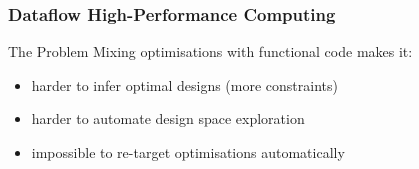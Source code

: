\begin{frame}[fragile]
  \frametitle{Dataflow High-Performance Computing}

  \begin{beamerboxesrounded}{The Problem}
    Mixing optimisations with functional code makes it:
    \begin{itemize}
    \item harder to infer optimal designs (more constraints)
    \item harder to automate design space exploration
    \item impossible to re-target optimisations automatically
    \end{itemize}
  \end{beamerboxesrounded}
\end{frame}

